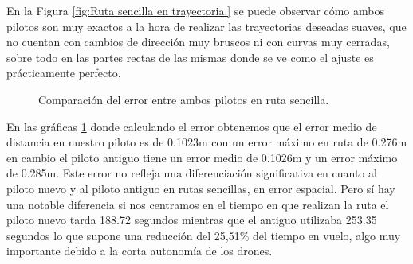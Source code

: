 \hspace{1cm} En la Figura \ref{fig:Ruta sencilla en trayectoria.} se puede observar cómo ambos pilotos son muy exactos a la hora de realizar las trayectorias deseadas suaves, que no cuentan con cambios de dirección muy bruscos ni con curvas muy cerradas, sobre todo en las partes rectas de las mismas donde se ve como el ajuste es prácticamente perfecto.

\begin{figure}[H]
 \centering
 \caption{Comparación del error entre ambos pilotos en ruta sencilla.}
 \label{f:Comparativa del error sencilla.}
\end{figure} 
 
\hspace{1cm} En las gráficas \ref{f:Comparativa del error sencilla.} donde calculando el error obtenemos que el error medio de distancia en nuestro piloto es de 0.1023m con un error máximo en ruta de 0.276m en cambio el piloto antiguo tiene un error medio de 0.1026m y un error máximo de 0.285m. Este error no refleja una diferenciación significativa en cuanto al piloto nuevo y al piloto antiguo en rutas sencillas, en error espacial. Pero sí hay una notable diferencia si nos centramos en el tiempo en que realizan la ruta el piloto nuevo tarda 188.72 segundos mientras que el antiguo utilizaba 253.35 segundos lo que supone una reducción del 25,51\% del tiempo en vuelo, algo muy importante debido a la corta autonomía de los drones.

